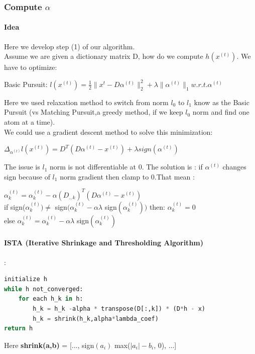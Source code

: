 \documentclass[a4paper,10pt]{article}
\begin{document}
\subsubsection{Compute $\alpha$ }
\paragraph{Idea}
Here we develop  step (1) of our algorithm.\\
Assume we are given a dictionary matrix D, how do we compute $h(x^{(t)})$. We have to optimize:
\begin{center}  Basic Pursuit:
$l(x^{(t)}) = \frac{1}{2} \| x^{t}- D \alpha^{(t)} \|^{2}_{2} + \lambda \|\alpha^{(t)}\|_1 w.r.t. \alpha^{(t)}$\\ 
\end{center} 
Here we used relaxation method to switch from norm $l_0$ to $l_1$ know as the  Basic Pursuit (vs Matching Pursuit,a greedy method,  if we keep $l_0$ norm and find one atom at a time).\\
We could use a gradient descent method to solve this minimization:\\
\begin{center}
$\Delta_{\alpha^{(t)}} l(x^{(t)}) = D^T (D \alpha^{(t)} - x^{(t)}) + \lambda sign(\alpha^{(t)})$
\end{center}
The issue is $l_1$ norm is not differentiable at 0. The solution is : if $\alpha^{(t)}$ changes sign because of $l_1$ norm gradient then clamp to 0.That mean :

$\alpha^{(t)}_k = \alpha^{(t)}_k   - \alpha (D_{., k})^T (D \alpha^{(t)} - x^{(t)})$\\
\indent if  sign($\alpha^{(t)}_k) \neq$ sign$(\alpha^{(t)}_k - \alpha \lambda$ sign$(\alpha^{(t)}_k) )$ then: $\alpha^{(t)}_k = 0$\\
\indent else $\alpha^{(t)}_k = \alpha^{(t)}_k - \alpha \lambda$ sign$(\alpha^{(t)}_k)$
\paragraph{ISTA (Iterative Shrinkage and Thresholding Algorithm)}
:
\begin{lstlisting}[language=Python,frame=single]
initialize h 
while h not_converged:
    for each h_k in h:
        h_k = h_k -alpha * transpose(D[:,k]) * (D*h - x)
        h_k = shrink(h_k,alpha*lambda_coef)
return h
\end{lstlisting}
Here \textbf{shrink(a,b) }= [..., sign$(a_i)$ max($|a_i| - b_i$, 0), ...]\\
\end{document}
